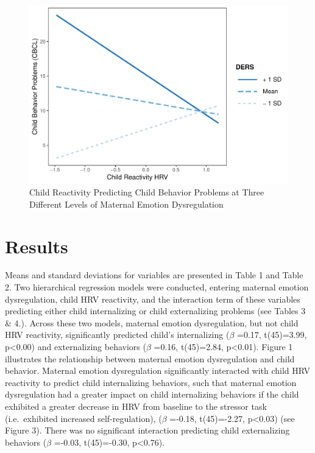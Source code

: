 \documentclass[man]{apa6}
\begin{document}
\begin{figure}
\centering
\includegraphics{DataPrepScript_apa_style_files/figure-latex/plot3-1.pdf}
\caption{\label{fig:plot3}Child Reactivity Predicting Child Behavior
Problems at Three Different Levels of Maternal Emotion Dysregulation}
\end{figure}

\section{Results}\label{results}

Means and standard deviations for variables are presented in Table 1 and
Table 2. Two hierarchical regression models were conducted, entering
maternal emotion dysregulation, child HRV reactivity, and the
interaction term of these variables predicting either child
internalizing or child externalizing problems (see Tables 3 \& 4.).
Across these two models, maternal emotion dysregulation, but not child
HRV reactivity, significantly predicted child's internalizing (\(\beta\)
=0.17, t(45)=3.99, p\textless{}0.00) and externalizing behaviors
(\(\beta\) =0.16, t(45)=2.84, p\textless{}0.01). Figure 1 illustrates
the relationship between maternal emotion dysregulation and child
behavior. Maternal emotion dysregulation significantly interacted with
child HRV reactivity to predict child internalizing behaviors, such that
maternal emotion dysregulation had a greater impact on child
internalizing behaviors if the child exhibited a greater decrease in HRV
from baseline to the stressor task (i.e.~exhibited increased
self-regulation), (\(\beta\) =-0.18, t(45)=-2.27, p\textless{}0.03) (see
Figure 3). There was no significant interaction predicting child
externalizing behaviors (\(\beta\) =-0.03, t(45)=-0.30,
p\textless{}0.76).
\end{document}
